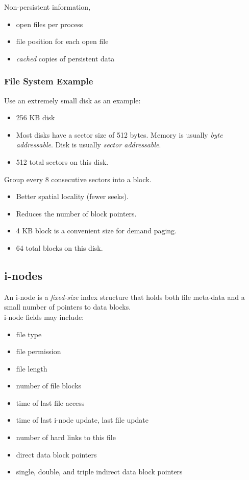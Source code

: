 \documentclass[12pt]{article}
\theoremstyle{plain}
\theoremstyle{definition}
\begin{document}
Non-persistent information,
\begin{itemize}
  \item open files per process
  \item file position for each open file
  \item \emph{cached} copies of persistent data
\end{itemize}

\subsubsection{File System Example}
Use an extremely small disk as an example:
\begin{itemize}
  \item 256 KB disk
  \item Most disks have a sector size of 512 bytes.
  Memory is usually \emph{byte addressable}.
  Disk is usually \emph{sector addressable}.
  \item 512 total sectors on this disk.
\end{itemize}

Group every 8 consecutive sectors into a block.
\begin{itemize}
  \item Better spatial locality (fewer seeks).
  \item Reduces the number of block pointers.
  \item 4 KB block is a convenient size for demand paging.
  \item 64 total blocks on this disk.
\end{itemize}

\subsection{i-nodes}
An i-node is a \emph{fixed-size} index structure that holds both file meta-data and a small number of pointers to data blocks. \\
i-node fields may include:
\begin{itemize}
  \item file type
  \item file permission
  \item file length
  \item number of file blocks
  \item time of last file access
  \item time of last i-node update, last file update
  \item number of hard links to this file
  \item direct data block pointers
  \item single, double, and triple indirect data block pointers
\end{itemize}
\end{document}
